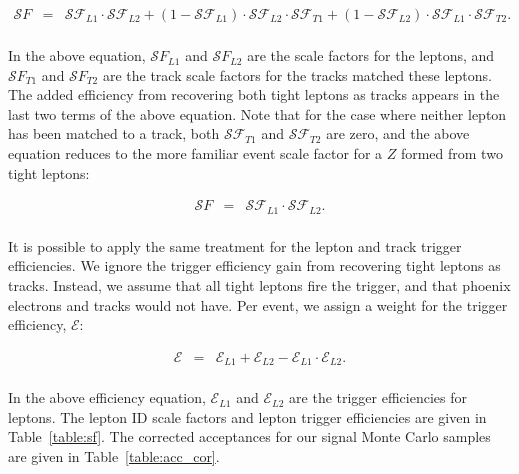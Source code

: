 \begin{eqnarray*}
{\mathcal SF} & = & \mathcal{SF}_{L1} \cdot \mathcal{SF}_{L2} 
               +  (1-\mathcal{SF}_{L1}) \cdot \mathcal{SF}_{L2} \cdot \mathcal{SF}_{T1} 
               +  (1-\mathcal{SF}_{L2}) \cdot \mathcal{SF}_{L1} \cdot \mathcal{SF}_{T2}. \\
\end{eqnarray*}

In the above equation, ${\mathcal SF}_{L1}$ and ${\mathcal SF}_{L2}$ are the scale factors
for the leptons, and ${\mathcal SF}_{T1}$ and ${\mathcal SF}_{T2}$ are the track scale factors
for the tracks matched these leptons. The added efficiency from recovering both tight 
leptons as tracks appears in the last two terms of the above equation. Note that for 
the case where neither lepton has been matched to a track, both $\mathcal{SF}_{T1}$ 
and $\mathcal{SF}_{T2}$ are zero, and the above equation reduces to the more familiar 
event scale factor for a $Z$ formed from two tight leptons:

\begin{eqnarray*}
{\mathcal SF} & = & \mathcal{SF}_{L1} \cdot \mathcal{SF}_{L2}. \\
\end{eqnarray*}

It is possible to apply the same treatment for the lepton and track trigger efficiencies. 
We ignore the trigger efficiency gain from recovering tight leptons as tracks. Instead, we
assume that all tight leptons fire the trigger, and that phoenix electrons and tracks
would not have. Per event, we assign a weight for the trigger efficiency, 
${\mathcal E}$:

\begin{eqnarray*}
{\mathcal E} & = & \mathcal{E}_{L1} + \mathcal{E}_{L2} 
                        -  \mathcal{E}_{L1} \cdot \mathcal{E}_{L2}. \\
\end{eqnarray*}

In the above efficiency equation, ${\mathcal E}_{L1}$ and ${\mathcal E}_{L2}$ are the trigger 
efficiencies for leptons. The lepton ID scale factors and lepton 
trigger efficiencies are given in Table~\ref{table:sf}. The corrected acceptances for our 
signal Monte Carlo samples are given in Table~\ref{table:acc_cor}.


